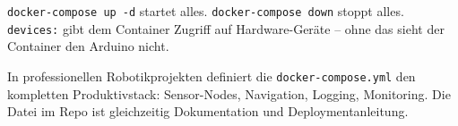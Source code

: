 \begin{merksatzBox}
\texttt{docker-compose up -d} startet alles.
\texttt{docker-compose down} stoppt alles.
\texttt{devices:} gibt dem Container Zugriff auf
Hardware-Geräte -- ohne das sieht der Container
den Arduino nicht.
\end{merksatzBox}

\begin{robotikBox}
In professionellen Robotikprojekten definiert die
\texttt{docker-compose.yml} den kompletten Produktivstack:
Sensor-Nodes, Navigation, Logging, Monitoring.
Die Datei im Repo ist gleichzeitig Dokumentation
und Deploymentanleitung.
\end{robotikBox}
